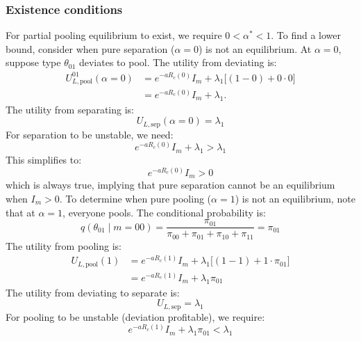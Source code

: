 \documentclass[sigconf,review]{acmart}
\begin{document}
\subsubsection{Existence conditions}
For partial pooling equilibrium to exist, we require $0 < \alpha^* < 1$. To find a lower bound, consider when pure separation ($\alpha = 0$) is not an equilibrium. At $\alpha = 0$, suppose type $\theta_{01}$ deviates to pool. The utility from deviating is:
\begin{equation}
\begin{aligned}
U_{L,\text{pool}}^{01}(\alpha=0)
&= e^{-a R_c(0)} I_m + \lambda_1 \big[(1 - 0) + 0 \cdot 0 \big] \\
&= e^{-a R_c(0)} I_m + \lambda_1 .
\end{aligned}
\end{equation}
The utility from separating is:
\begin{equation}
U_{L,\text{sep}}(\alpha=0) = \lambda_1
\end{equation}
For separation to be unstable, we need:
\begin{equation}
e^{-a R_c(0)} I_m + \lambda_1 > \lambda_1
\end{equation}
This simplifies to:
\begin{equation}
e^{-a R_c(0)} I_m > 0
\end{equation}
which is always true, implying that pure separation cannot be an equilibrium when $I_m > 0$. To determine when pure pooling ($\alpha = 1$) is not an equilibrium, note that at $\alpha = 1$, everyone pools. The conditional probability is:
\begin{equation}
q(\theta_{01} \mid m = 00) = \frac{\pi_{01}}{\pi_{00} + \pi_{01} + \pi_{10} + \pi_{11}} = \pi_{01}
\end{equation}
The utility from pooling is:
\begin{equation}
\begin{aligned}
U_{L,\text{pool}}(1) &= e^{-a R_c(1)} I_m + \lambda_1 \big[(1 - 1) + 1 \cdot \pi_{01}\big]\\& = e^{-a R_c(1)} I_m + \lambda_1 \pi_{01}
\end{aligned}
\end{equation}
The utility from deviating to separate is:
\begin{equation}
U_{L,\text{sep}} = \lambda_1
\end{equation}
For pooling to be unstable (deviation profitable), we require:
\begin{equation}
e^{-a R_c(1)} I_m + \lambda_1 \pi_{01} < \lambda_1
\end{equation}
\end{document}
